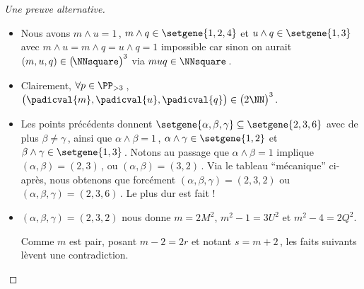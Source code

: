 \begin{proof}[Une preuve alternative]
\begin{itemize}
		\item Nous avons $m \wedge u = 1$\,, $m \wedge q \in \setgene{1, 2, 4}$ et $u \wedge q \in \setgene{1, 3}$
		avec $m \wedge u = m \wedge q = u \wedge q = 1$ impossible car sinon on aurait $(m, u, q) \in \big( \kern-1.5pt\NNsquare \big)^3$ via $muq \in \NNsquare$\,.


		\item Clairement, $\forall p \in \PP_{>3}$\,, $\big( \padicval{m} , \padicval{u} , \padicval{q} \big) \in \big( 2 \NN \big)^3$.


		\item Les points précédents donnent 
		$\setgene{\alpha, \beta, \gamma} \subseteq \setgene{2, 3, 6}$
		avec de plus
		$\beta \neq \gamma$\,,
		ainsi que 
		$\alpha \wedge \beta = 1$\,, $\alpha \wedge \gamma \in \setgene{1, 2}$ et $\beta \wedge \gamma \in \setgene{1, 3}$\,.
		Notons au passage que $\alpha \wedge \beta = 1$ implique $(\alpha, \beta) = (2, 3)$\,, ou $(\alpha, \beta) = (3, 2)$\,.
		Via le tableau \enquote{mécanique} ci-après, nous obtenons que forcément $(\alpha, \beta, \gamma) = (2, 3, 2)$ ou $(\alpha, \beta, \gamma) = (2, 3, 6)$\,. Le plus dur est fait !
	\end{itemize}

	\begin{center}
	\end{center}


	\begin{itemize}
		\item $(\alpha, \beta, \gamma) = (2, 3, 2)$ nous donne $m = 2 M^2$, $m^2 - 1 = 3 U^2$ et $m^2 - 4 = 2 Q^2$.

		\noindent
		Comme $m$ est pair, posant $m - 2 = 2 r$ et notant $s = m + 2$\,, les faits suivants lèvent une contradiction.
		

\end{itemize}
\end{proof}

